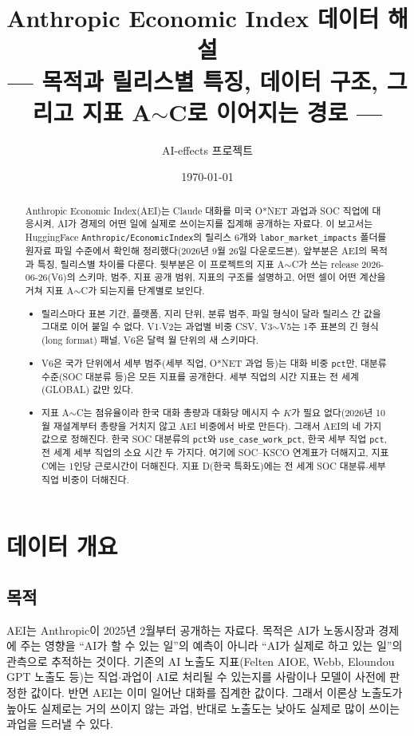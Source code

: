 \documentclass[11pt]{article}
\title{Anthropic Economic Index 데이터 해설\\[2mm]
\large --- 목적과 릴리스별 특징, 데이터 구조, 그리고 지표 A$\sim$C로 이어지는 경로 ---}
\author{AI-effects 프로젝트}
\date{\today}
\begin{document}
\maketitle

\begin{abstract}
\noindent Anthropic Economic Index(AEI)는 Claude 대화를 미국 O*NET 과업과 SOC 직업에 대응시켜, AI가 경제의 어떤 일에 실제로 쓰이는지를 집계해 공개하는 자료다. 이 보고서는 HuggingFace \texttt{Anthropic/EconomicIndex}의 릴리스 6개와 \texttt{labor\_market\_impacts} 폴더를 원자료 파일 수준에서 확인해 정리했다(2026년 9월 26일 다운로드본). 앞부분은 AEI의 목적과 특징, 릴리스별 차이를 다룬다. 뒷부분은 이 프로젝트의 지표 A$\sim$C가 쓰는 release 2026-06-26(V6)의 스키마, 범주, 지표 공개 범위, 지표의 구조를 설명하고, 어떤 셀이 어떤 계산을 거쳐 지표 A$\sim$C가 되는지를 단계별로 보인다.
\begin{itemize}[leftmargin=*]
  \item 릴리스마다 표본 기간, 플랫폼, 지리 단위, 분류 범주, 파일 형식이 달라 릴리스 간 값을 그대로 이어 붙일 수 없다. V1$\cdot$V2는 과업별 비중 CSV, V3$\sim$V5는 1주 표본의 긴 형식(long format) 패널, V6은 달력 월 단위의 새 스키마다.
  \item V6은 국가 단위에서 세부 범주(세부 직업, O*NET 과업 등)는 대화 비중 \texttt{pct}만, 대분류 수준(SOC 대분류 등)은 모든 지표를 공개한다. 세부 직업의 시간 지표는 전 세계(GLOBAL) 값만 있다.
  \item 지표 A$\sim$C는 점유율이라 한국 대화 총량과 대화당 메시지 수 $K$가 필요 없다(2026년 10월 재설계부터 총량을 거치지 않고 AEI 비중에서 바로 만든다). 그래서 AEI의 네 가지 값으로 정해진다. 한국 SOC 대분류의 \texttt{pct}와 \texttt{use\_case\_work\_pct}, 한국 세부 직업 \texttt{pct}, 전 세계 세부 직업의 소요 시간 두 가지다. 여기에 SOC--KSCO 연계표가 더해지고, 지표 C에는 1인당 근로시간이 더해진다. 지표 D(한국 특화도)에는 전 세계 SOC 대분류$\cdot$세부 직업 비중이 더해진다.
\end{itemize}
\end{abstract}

\tableofcontents

\section{데이터 개요}

\subsection{목적}

AEI는 Anthropic이 2025년 2월부터 공개하는 자료다. 목적은 AI가 노동시장과 경제에 주는 영향을 ``AI가 할 수 있는 일''의 예측이 아니라 ``AI가 실제로 하고 있는 일''의 관측으로 추적하는 것이다\parencite{handa-2025-which-economic-tasks-are}. 기존의 AI 노출도 지표(Felten AIOE, Webb, Eloundou GPT 노출도 등)는 직업$\cdot$과업이 AI로 처리될 수 있는지를 사람이나 모델이 사전에 판정한 값이다. 반면 AEI는 이미 일어난 대화를 집계한 값이다. 그래서 이론상 노출도가 높아도 실제로는 거의 쓰이지 않는 과업, 반대로 노출도는 낮아도 실제로 많이 쓰이는 과업을 드러낼 수 있다.
\end{document}
